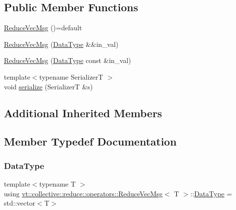 \subsection*{Public Member Functions}
\begin{DoxyCompactItemize}
\item 
\hyperlink{structvt_1_1collective_1_1reduce_1_1operators_1_1_reduce_vec_msg_a3e167018ff1d8a0a4bf85843705b737d}{Reduce\+Vec\+Msg} ()=default
\item 
\hyperlink{structvt_1_1collective_1_1reduce_1_1operators_1_1_reduce_vec_msg_a6be0b12305ea5f7ddcf792b903686dcc}{Reduce\+Vec\+Msg} (\hyperlink{structvt_1_1collective_1_1reduce_1_1operators_1_1_reduce_vec_msg_a556927389ef91ea8f5a7892501724a37}{Data\+Type} \&\&in\+\_\+val)
\item 
\hyperlink{structvt_1_1collective_1_1reduce_1_1operators_1_1_reduce_vec_msg_a5d374c7e9b8b04aea7aff6d333ac5907}{Reduce\+Vec\+Msg} (\hyperlink{structvt_1_1collective_1_1reduce_1_1operators_1_1_reduce_vec_msg_a556927389ef91ea8f5a7892501724a37}{Data\+Type} const \&in\+\_\+val)
\item 
{\footnotesize template$<$typename SerializerT $>$ }\\void \hyperlink{structvt_1_1collective_1_1reduce_1_1operators_1_1_reduce_vec_msg_a61a7c876f69e2eed53d6cf73674c4b8c}{serialize} (SerializerT \&s)
\end{DoxyCompactItemize}
\subsection*{Additional Inherited Members}


\subsection{Member Typedef Documentation}
\mbox{\label{structvt_1_1collective_1_1reduce_1_1operators_1_1_reduce_vec_msg_a556927389ef91ea8f5a7892501724a37}} 
\subsubsection{\texorpdfstring{Data\+Type}{DataType}}
{\footnotesize\ttfamily template$<$typename T $>$ \\
using \hyperlink{structvt_1_1collective_1_1reduce_1_1operators_1_1_reduce_vec_msg}{vt\+::collective\+::reduce\+::operators\+::\+Reduce\+Vec\+Msg}$<$ T $>$\+::\hyperlink{structvt_1_1collective_1_1reduce_1_1operators_1_1_reduce_vec_msg_a556927389ef91ea8f5a7892501724a37}{Data\+Type} =  std\+::vector$<$T$>$}

